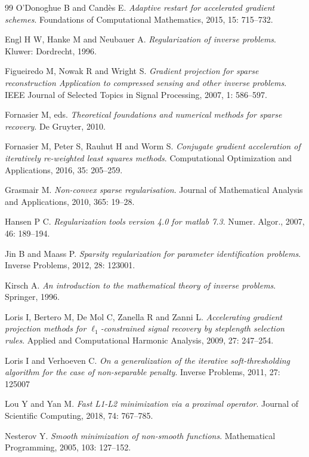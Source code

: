 \documentclass[a4paper,12pt]{article}
\numberwithin{equation}{section}
\begin{document}
\begin{thebibliography}{99}
O'Donoghue B and Cand\`{e}s E. \emph{Adaptive restart for accelerated gradient schemes}. Foundations of Computational Mathematics, 2015, 15: 715--732.

Engl H W, Hanke M and Neubauer A. \emph{Regularization of inverse problems}. Kluwer: Dordrecht, 1996.

Figueiredo M, Nowak R and Wright S. \emph{Gradient projection for sparse reconstruction Application to compressed sensing and other inverse problems}. IEEE Journal of Selected Topics in Signal Processing, 2007, 1: 586--597.

Fornasier M, eds. \emph{Theoretical foundations and numerical methods for sparse recovery}. De Gruyter, 2010.

Fornasier M, Peter S, Rauhut H and Worm S. \emph{Conjugate gradient acceleration of iteratively re-weighted least squares methods}. Computational Optimization and Applications, 2016, 35: 205--259.

Grasmair M. \emph{Non-convex sparse regularisation}. Journal of Mathematical Analysis and Applications, 2010, 365: 19--28.

Hansen P C. \emph{Regularization tools version 4.0 for matlab 7.3}. Numer. Algor., 2007, 46: 189--194. 

Jin B and Maass P. \emph{Sparsity regularization for parameter identification problems}. Inverse Problems, 2012, 28: 123001.

Kirsch A. \emph{An introduction to the mathematical theory of inverse problems}. Springer, 1996.

Loris I, Bertero M, De Mol C, Zanella R and Zanni L. \emph{Accelerating gradient projection methods for $\ell_1$-constrained signal recovery by steplength selection rules}. Applied and Computational Harmonic Analysis, 2009, 27: 247--254.

Loris I and Verhoeven C. \emph{On a generalization of the iterative soft-thresholding algorithm for the case of non-separable penalty}. Inverse Problems, 2011, 27: 125007

Lou Y and Yan M. \emph{Fast L1-L2 minimization via a proximal operator}. Journal of Scientific Computing, 2018, 74: 767--785.

Nesterov Y. \emph{Smooth minimization of non-smooth functions}. Mathematical Programming, 2005, 103: 127--152.


\end{thebibliography}
\end{document}
